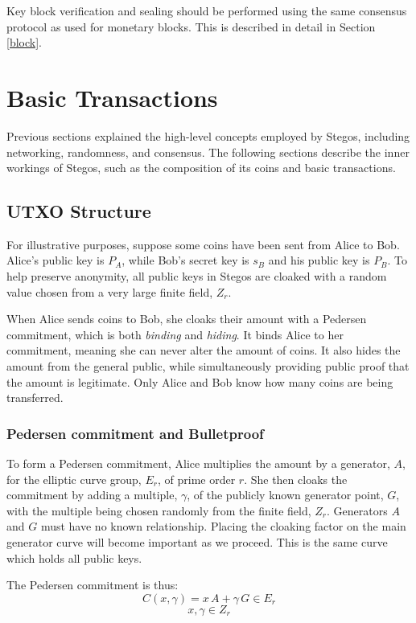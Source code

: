 \documentclass[a4paper, 10pt, conference]{ieeeconf}
\begin{document}
Key block verification and sealing should be performed using the same consensus protocol as used for monetary blocks. This is described in detail in Section \ref{block}.

\section{Basic Transactions}\label{transactions}

Previous sections explained the high-level concepts employed by Stegos, including networking, randomness, and consensus. The following sections describe the inner workings of Stegos, such as the composition of its coins and basic transactions.

\subsection{UTXO Structure}\label{utxo}

For illustrative purposes, suppose some coins have been sent from Alice to Bob. Alice's public key is $P_A$, while Bob's secret key is $s_B$ and his public key is $P_B$. To help preserve anonymity, all public keys in Stegos are cloaked with a random value chosen from a very large finite field, $Z_r$.

When Alice sends coins to Bob, she cloaks their amount with a Pedersen commitment, which is both \textit{binding} and \textit{hiding}. It binds Alice to her commitment, meaning she can never alter the amount of coins. It also hides the amount from the general public, while simultaneously providing public proof that the amount is legitimate. Only Alice and Bob know how many coins are being transferred. 

\subsubsection{Pedersen commitment and Bulletproof} To form a Pedersen commitment, Alice multiplies the amount by a generator, $A$, for the elliptic curve group, $E_r$, of prime order $r$. She then cloaks the commitment by adding a multiple, $\gamma$, of the publicly known generator point, $G$, with the multiple being chosen randomly from the finite field, $Z_r$. Generators $A$ and $G$ must have no known relationship. Placing the cloaking factor on the main generator curve will become important as we proceed. This is the same curve which holds all public keys. 

The Pedersen commitment is thus:
$$ C(x, \gamma) = x \, A + \gamma \, G \in E_r$$
$$x, \gamma \in Z_r$$
\end{document}
